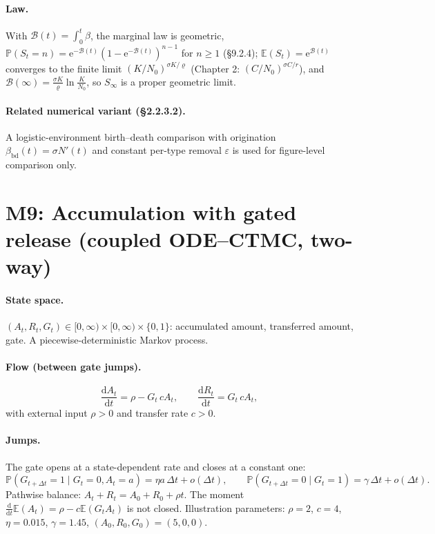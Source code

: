 \documentclass[11pt,a4paper]{report}
\newcommand{\pr}[1]{\mathbb{P}\!\left(#1\right)}
\newcommand{\ex}[1]{\mathbb{E}\!\left(#1\right)}
\newcommand{\dd}{\mathrm{d}}
\newcommand{\ee}{\mathrm{e}}
\newcommand{\dda}[2]{\frac{\dd #1}{\dd #2}}
\newcommand{\Bint}{\mathcal{B}}
\newcommand{\source}[1]{\par\noindent{\small\textit{Specified in #1.}}\par\medskip}
\begin{document}
\paragraph{Law.} With $\Bint(t)=\int_0^t\beta$, the marginal law is
geometric, $\pr{S_t=n}=\ee^{-\Bint(t)}(1-\ee^{-\Bint(t)})^{n-1}$ for
$n\ge1$ (\S9.2.4); $\ex{S_t}=\ee^{\Bint(t)}$ converges to the finite limit
$(K/N_0)^{\sigma K/\varrho}$ (Chapter 2: $(C/N_0)^{\sigma C/r}$), and
$\Bint(\infty)=\frac{\sigma K}{\varrho}\ln\frac{K}{N_0}$, so $S_\infty$ is
a proper geometric limit.

\paragraph{Related numerical variant (\S2.2.3.2).} A
logistic-environment birth--death comparison with origination
$\beta_{\mathrm{bd}}(t)=\sigma N'(t)$ and constant per-type removal
$\varepsilon$ is used for figure-level comparison only.

\section{M9: Accumulation with gated release (coupled ODE--CTMC, two-way)}
\source{\S2.2.4.1}

\paragraph{State space.} $(A_t,R_t,G_t)\in[0,\infty)\times[0,\infty)\times
\{0,1\}$: accumulated amount, transferred amount, gate. A
piecewise-deterministic Markov process.

\paragraph{Flow (between gate jumps).}
\begin{equation}
\dda{A_t}{t}=\rho-G_t\,cA_t,
\qquad
\dda{R_t}{t}=G_t\,cA_t ,
\end{equation}
with external input $\rho>0$ and transfer rate $c>0$.

\paragraph{Jumps.} The gate opens at a state-dependent rate and closes at a
constant one:
\begin{equation}
\pr{G_{t+\Delta t}=1\mid G_t=0,A_t=a}
=\eta a\,\Delta t+o(\Delta t),
\qquad
\pr{G_{t+\Delta t}=0\mid G_t=1}
=\gamma\,\Delta t+o(\Delta t).
\end{equation}
Pathwise balance: $A_t+R_t=A_0+R_0+\rho t$. The moment
$\dda{}{t}\ex{A_t}=\rho-c\ex{G_tA_t}$ is not closed.
Illustration parameters: $\rho=2$, $c=4$, $\eta=0.015$, $\gamma=1.45$,
$(A_0,R_0,G_0)=(5,0,0)$.
\end{document}
